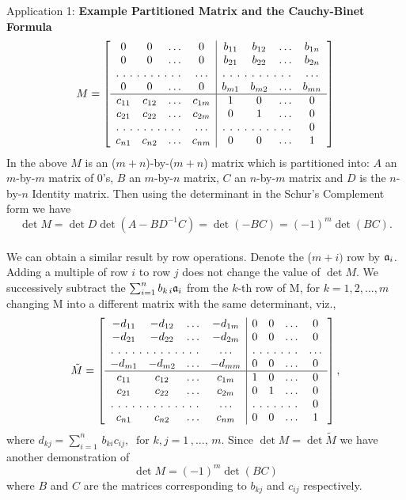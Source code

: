  Application 1: {\bf Example Partitioned Matrix and the Cauchy-Binet Formula}
 \begin{equation}
 M =
\left[
  \begin{array}{cccc|cccc}
  0 &  0 & \hdots & 0  & b_{11} & b_{12} & \hdots & b_{1n}\\
  0 & 0 & \hdots  & 0 & b_{21} & b_{22} & \hdots & b_{2n}\\
  \hdotsfor[2]{3} & \hdots &\hdotsfor[2]{3} & \hdots\\
  0 & 0 & \hdots  & 0 & b_{m1} & b_{m2} & \hdots & b_{mn}\\
  \hline
  c_{11} &  c_{12} &\hdots & c_{1m} & 1 & 0& \hdots & 0\\
  c_{21} &  c_{22} &\hdots & c_{2m} & 0 & 1& \hdots & 0\\
  \hdotsfor[2]{3} & \hdots & \hdotsfor[2]{3} & 0\\
  c_{n1} &  c_{n2} &\hdots & c_{nm} & 0 & 0& \hdots& 1 
\end{array} \right]
\end{equation}
In the above $M$ is an ($m+n$)-by-($m+n$) matrix which is partitioned into: $A$ an $m$-by-$m$ matrix of 0's, $B$ an $m$-by-$n$ matrix, $C$ an $n$-by-$m$ matrix and $D$ is the $n$-by-$n$ Identity matrix. Then using the determinant in the Schur's Complement form we have
$$\det M = \det D \det(A - BD^{-1}C) = \det (-BC) = (-1)^m \det(BC).$$\\

We can obtain a similar result by row operations. Denote the ($m+i)$ row by $\mathfrak{a}_i$.  Adding a multiple of row $i$ to row $j$ does not change the value of $\det M$.
We successively subtract the $\sum_{i=1}^n b_{k\, i} \mathfrak{a}_i$ from the $k$-th row of M, for $k=1, 2, ..., m$ changing M into a different matrix with the same determinant, viz.,
 \begin{equation}
 \tilde M=
\left[
  \begin{array}{cccc|cccc}
  -d_{11} &  -d_{12} & \hdots & -d_{1m}  & 0 & 0& \hdots & 0\\
  -d_{21} & -d_{22}  & \hdots  & -d_{2m}  & 0 & 0 & \hdots & 0\\
  \hdotsfor[2]{3} & \hdots &\hdotsfor[2]{3} & \hdots\\
  -d_{m1} & -d_{m2} & \hdots  & -d_{mm} & 0 & 0 & \hdots & 0\\
  \hline
  c_{11} &  c_{12} &\hdots & c_{1m} & 1 & 0& \hdots & 0\\
  c_{21} &  c_{22} &\hdots & c_{2m} & 0 & 1& \hdots & 0\\
  \hdotsfor[2]{3} & \hdots & \hdotsfor[2]{3} & 0\\
  c_{n1} &  c_{n2} &\hdots & c_{nm} & 0 & 0& \hdots& 1 
\end{array} \right],
\end{equation}where $\displaystyle{d_{kj} = \sum_{i=1}^n \, b_{ki} c_{ij}}, ~\mbox{ for } k,j = 1\,,...,\,m$. Since $\det M = \det \tilde M$ we have another demonstration of 
\begin{equation}
\det M = (-1)^m \det (BC)
\end{equation} where $B$ and $C$ are the matrices corresponding to $b_{kj}$ and $c_{ij}$ respectively.\\


